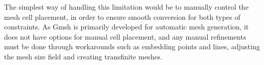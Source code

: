 The simplest way of handling this limitation would be to manually control the mesh cell placement, in order to ensure smooth conversion for both types of constraints. As Gmsh is primarily developed for automatic mesh generation, it does not have options for manual cell placement, and any manual refinements must be done through workarounds such as embedding points and lines, adjusting the mesh size field and creating transfinite meshes.
